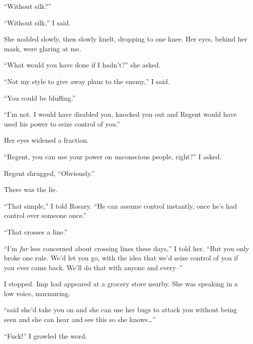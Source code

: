 ``Without silk?''



``Without silk,'' I said.



She nodded slowly, then slowly knelt, dropping to one knee.  Her eyes, behind her mask, were glaring at me.



``What would you have done if I hadn't?'' she asked.



``Not my style to give away plans to the enemy,'' I said.



``You could be bluffing.''



``I'm not.  I would have disabled you, knocked you out and Regent would have used his power to seize control of you.''



Her eyes widened a fraction.



``Regent, you can use your power on unconscious people, right?'' I asked.



Regent shrugged, ``Obviously.''



There was the lie.



``That simple,'' I told Rosary.  ``He can assume control instantly, once he's had control over someone once.''



``That crosses a line.''



``I'm \emph{far} less concerned about crossing lines these days,'' I told her.  ``But you only broke one rule.  We'd let you go, with the idea that we'd seize control of you if you ever came back.  We'll do that with anyone and every--''



I stopped.  Imp had appeared at a grocery store nearby.  She was speaking in a low voice, murmuring.



``\ldotsSkitter said she'd take you on and she can use her bugs to attack you without being seen and she can hear and see this so she knows\ldots''



``Fuck!'' I growled the word.



